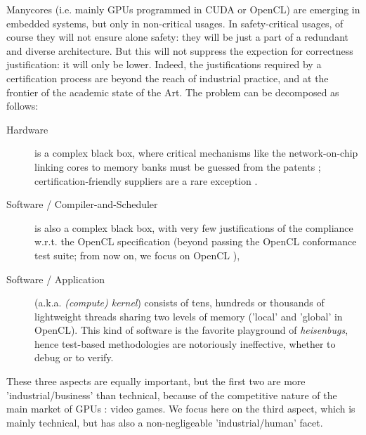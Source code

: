 \documentclass[a4paper,10pt]{article} %
\begin{document}
Manycores (i.e. mainly GPUs programmed in CUDA or OpenCL) are emerging in embedded systems, but only in non-critical usages.
In safety-critical usages, of course they will not ensure alone safety: they will be just a part of a redundant and diverse architecture.
But this will not suppress  the expection for correctness justification:  it will only be lower.
Indeed, the justifications required by a certification process are  beyond the reach of industrial practice,
and at the frontier of the academic state of the Art.
The problem can be decomposed as follows:
\begin{description}
\item[Hardware] is a complex black box, where critical mechanisms like the network-on-chip linking cores to memory banks must be guessed from the patents  \cite{aamodt2018general}; certification-friendly suppliers are a rare exception \cite{boyer2018computing}.
\item[Software / Compiler-and-Scheduler] is also a complex black box, with very few justifications of the compliance w.r.t. the OpenCL specification (beyond passing the OpenCL conformance test suite; from now on, we focus on OpenCL \cite{munshi2011opencl}),
\item[Software / Application] (a.k.a. \emph{(compute) kernel}) consists of tens, hundreds or thousands of lightweight threads sharing two levels of memory ('local' and 'global' in OpenCL). This kind of software is the favorite playground of \emph{heisenbugs}, hence test-based methodologies are notoriously ineffective, whether to debug or to verify.
\end{description}
These three aspects are equally important, but the first two are more 'industrial/business' than technical, because of the competitive nature of the main market of GPUs : video games. We focus here on the third aspect, which is mainly technical, but has also a non-negligeable 'industrial/human' facet.
\end{document}
